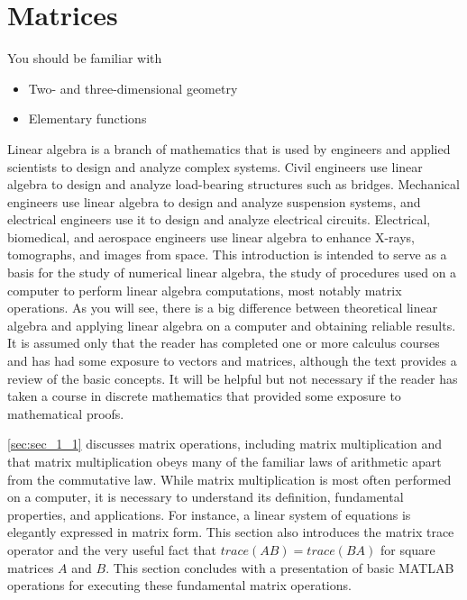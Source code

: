 \documentclass[../main.tex]{subfiles}
\begin{document}
\chapter{Matrices}
\label{chap:chap_1}
\setcounter{page}{1}

You should be familiar with
\begin{itemize}[noitemsep]
	\item Two- and three-dimensional geometry
	\item Elementary functions 
\end{itemize}

Linear algebra is a branch of mathematics that is used by engineers and applied scientists to design and analyze complex systems. Civil engineers use linear algebra to design and analyze load-bearing structures such as bridges. Mechanical
engineers use linear algebra to design and analyze suspension systems, and electrical engineers use it to design and analyze electrical circuits. Electrical, biomedical, and aerospace engineers use linear algebra to enhance X-rays, tomographs, and
images from space. This introduction is intended to serve as a basis for the study of numerical linear algebra, the study of procedures used on a computer to perform linear algebra computations, most notably matrix operations. As you will see,
there is a big difference between theoretical linear algebra and applying linear algebra on a computer and obtaining reliable results. It is assumed only that the reader has completed one or more calculus courses and has had some exposure to vectors and matrices, although the text provides a review of the basic concepts. It will be helpful but not necessary if the reader has taken a course in discrete mathematics that provided some exposure to mathematical proofs.

 \autoref{sec:sec_1_1} discusses matrix operations, including matrix multiplication and that matrix multiplication obeys many of the familiar laws of arithmetic apart from the commutative law. While matrix multiplication is most often performed on a
computer, it is necessary to understand its definition, fundamental properties, and applications. For instance, a linear system of equations is elegantly expressed in matrix form. This section also introduces the matrix trace operator and the very useful fact that $trace (AB) = trace (BA)$ for square matrices $A$ and $B$. This section concludes with a presentation of basic MATLAB operations for executing these fundamental matrix operations.
\end{document}
